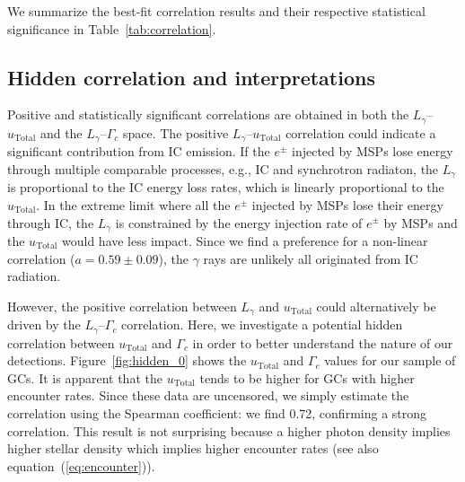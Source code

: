 \documentclass[doublespace,nopageskip]{VTthesis} %
\begin{document}
We summarize the best-fit correlation results and their respective statistical significance in Table~\ref{tab:correlation}.

\subsection{Hidden correlation and interpretations}\label{sec:hidden}

Positive and statistically significant correlations are obtained in both the $L_\gamma$--$u_\mathrm{Total}$ and the $L_\gamma$--$\Gamma_c$ space. The positive $L_\gamma$--$u_\mathrm{Total}$ correlation could indicate a  significant contribution from IC emission. If the $e^\pm$ injected by MSPs lose energy through multiple comparable processes, e.g., IC and synchrotron radiaton, the $L_\gamma$ is proportional to the IC energy loss rates, which is linearly proportional to the $u_\mathrm{Total}$. In the extreme limit where all the $e^\pm$ injected by MSPs lose their energy through IC, the $L_\gamma$ is constrained by the energy injection rate of $e^\pm$ by MSPs and the $u_\mathrm{Total}$ would have less impact. Since we find a preference for a non-linear correlation ($a= 0.59 \pm 0.09$), the $\gamma$ rays are unlikely all originated from IC radiation.

However, the positive correlation between $L_\gamma$ and $u_\mathrm{Total}$ could alternatively be driven by the $L_\gamma$--$\Gamma_c$ correlation. Here, we investigate a potential hidden correlation between $u_\mathrm{Total}$ and $\Gamma_c$ in order to better understand the nature of our detections. Figure~\ref{fig:hidden_0} shows the $u_\mathrm{Total}$ and $\Gamma_c$ values for our sample of GCs. It is apparent that the $u_\mathrm{Total}$ tends to be higher for GCs with higher encounter rates. Since these data are uncensored, we simply estimate the correlation using the Spearman coefficient: we find 0.72, confirming a strong correlation. This result is not surprising because a higher photon density implies higher stellar density which implies higher encounter rates (see also equation~(\ref{eq:encounter})).
\end{document}
